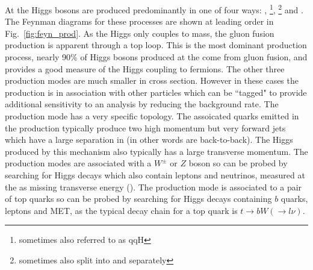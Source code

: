At the \LHC \SM Higgs bosons are produced predominantly in one of four ways: \ggH, \VBF\footnote{sometimes also referred to as qqH}, \VH\footnote{sometimes also split into \WH and \ZH separately} and \ttH. The Feynman diagrams for these processes are shown at leading order in Fig.~\ref{fig:feyn_prod}. As the Higgs only couples to mass, the gluon fusion production is apparent through a top loop. This is the most dominant production process, nearly 90\% of Higgs bosons produced at the \LHC come from gluon fusion, and provides a good measure of the Higgs coupling to fermions. The other three production modes are much smaller in cross section. However in these cases the production is in association with other particles which can be ``tagged" to provide additional sensitivity to an analysis by reducing the background rate. The \VBF production mode has a very specific topology. The assoicated quarks emitted in the production typically produce two high momentum but very forward jets which have a large separation in \eta (in other words are back-to-back). The Higgs produced by this mechanism also typically has a large transverse momentum. The \VH production modes are associated with a $W^{\pm}$ or $Z$ boson so can be probed by searching for Higgs decays which also contain leptons and neutrinos, measured at the \LHC as missing transverse energy (\MET). The \ttH production mode is associated to a pair of top quarks so can be probed by searching for Higgs decays containing $b$ quarks, leptons and MET, as the typical decay chain for a top quark is $t\rightarrow bW(\rightarrow l\nu)$.

